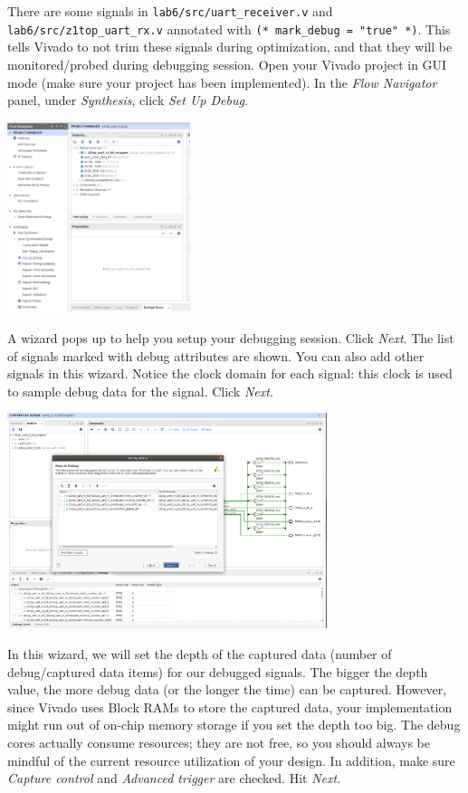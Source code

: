 \documentclass[11pt]{article}
\begin{document}
There are some signals in \verb|lab6/src/uart_receiver.v| and \verb|lab6/src/z1top_uart_rx.v| annotated with \verb|(* mark_debug = "true" *)|. This tells Vivado to not trim these signals during optimization, and that they will be monitored/probed during debugging session. Open your Vivado project in GUI mode (make sure your project has been implemented). In the \emph{Flow Navigator} panel, under \emph{Synthesis}, click \emph{Set Up Debug}.

\begin{center}
\includegraphics[width=0.4\textwidth]{figs/vivado-ila-1.png}
\end{center}

A wizard pops up to help you setup your debugging session. Click \emph{Next}. The list of signals marked with debug attributes are shown. You can also add other signals in this wizard. Notice the clock domain for each signal: this clock is used to sample debug data for the signal. Click \emph{Next}.

\begin{center}
\includegraphics[width=0.7\textwidth]{figs/vivado-ila-2.png}
\end{center}

In this wizard, we will set the depth of the captured data (number of debug/captured data items) for our debugged signals. The bigger the depth value, the more debug data (or the longer the time) can be captured. However, since Vivado uses Block RAMs to store the captured data, your implementation might run out of on-chip memory storage if you set the depth too big. The debug cores actually consume resources; they are not free, so you should always be mindful of the current resource utilization of your design. In addition, make sure \emph{Capture control} and \emph{Advanced trigger} are checked. Hit \emph{Next}.
\end{document}

